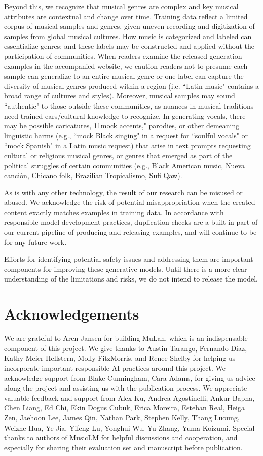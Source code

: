 Beyond this, we recognize that musical genres are complex and key musical attributes are contextual and change over time. Training data reflect a limited corpus of musical samples and genres, given uneven recording and digitization of samples from global musical cultures. How music is categorized and labeled can essentialize genres; and these labels may be constructed and applied without the participation of communities. 
When readers examine the released generation examples in the accompanied website, we caution readers not to presume each sample can generalize to an entire musical genre or one label can capture the diversity of musical genres produced within a region (i.e. ``Latin music" contains a broad range of cultures and styles). Moreover, musical samples may sound ``authentic" to those outside these communities, as nuances in musical traditions need trained ears/cultural knowledge to recognize. In generating vocals, there may be possible caricatures, 11mock accents," parodies, or other demeaning linguistic harms (e.g., ``mock Black singing" in a request for ``soulful vocals" or ``mock Spanish" in a Latin music request) that arise in text prompts requesting cultural or religious musical genres, or genres that emerged as part of the political struggles of certain communities (e.g., Black American music, Nueva canci\'on, Chicano folk, Brazilian Tropicalismo, Sufi Qaw).

As is with any other technology, the result of our research can be misused or abused. We acknowledge the risk of potential misappropriation when the created content exactly matches examples in training data. In accordance with responsible model development practices, duplication checks are a built-in part of our current pipeline of producing and releasing examples, and will continue to be for any future work.

Efforts for identifying potential safety issues and addressing them are important components for improving these generative models. Until there is a more clear understanding of the limitations and risks, we do not intend to release the model.

\section*{Acknowledgements}
We are grateful to Aren Jansen for building MuLan, which is an indispensable component of this project. We give thanks to Austin Tarango, Fernando Diaz, Kathy Meier-Hellstern, Molly FitzMorris, and Renee Shelby for helping us incorporate important responsible AI practices around this project. We acknowledge support from Blake Cunningham, Cara Adams, for giving us advice along the project and assisting us with the publication process. We appreciate valuable feedback and support from Alex Ku, Andrea Agostinelli, Ankur Bapna, Chen Liang, Ed Chi, Ekin Dogus Cubuk, Erica Moreira, Esteban Real, Heiga Zen, Jaehoon Lee, James Qin, Nathan Park, Stephen Kelly, Thang Luoung, Weizhe Hua, Ye Jia, Yifeng Lu, Yonghui Wu, Yu Zhang, Yuma Koizumi. Special thanks to authors of MusicLM for helpful discussions and cooperation, and especially for sharing their evaluation set and manuscript before publication.

\newpage

